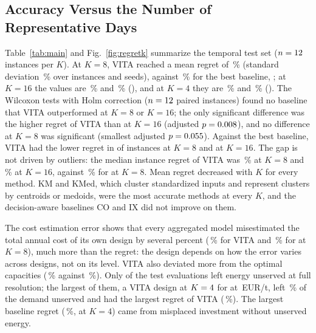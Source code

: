 \documentclass[journal]{IEEEtran}
\begin{document}
\subsection{Accuracy Versus the Number of Representative Days}
Table~\ref{tab:main} and Fig.~\ref{fig:regretk} summarize the temporal test set ($n=12$ instances per $K$). At $K=8$, VITA reached a mean regret of \RegVITAKeight\,\% (standard deviation \RegSdVITAKeight\,\% over instances and seeds), against \RegBestBaseKeight\,\% for the best baseline, \BestBaseNameKeight; at $K=16$ the values are \RegVITAKsixteen\,\% and \RegBestBaseKsixteen\,\% (\BestBaseNameKsixteen), and at $K=4$ they are \RegVITAKfour\,\% and \RegBestBaseKfour\,\% (\BestBaseNameKfour). The Wilcoxon tests with Holm correction ($n=12$ paired instances) found no baseline that VITA outperformed at $K=8$ or $K=16$; the only significant difference was the higher regret of VITA than \BestBaseNameKsixteen{} at $K=16$ (adjusted $p=0.008$), and no difference at $K=8$ was significant (smallest adjusted $p=0.055$). Against the best baseline, VITA had the lower regret in \WinsVsBestKeight{} of \NTest{} instances at $K=8$ and \WinsVsBestKsixteen{} at $K=16$. The gap is not driven by outliers: the median instance regret of VITA was \MedianRegVITAKeightInst\,\% at $K=8$ and \MedianRegVITAKsixteenInst\,\% at $K=16$, against \MedianRegBestKeight\,\% for \BestBaseNameKeight{} at $K=8$. Mean regret decreased with $K$ for every method. KM and KMed, which cluster standardized inputs and represent clusters by centroids or medoids, were the most accurate methods at every $K$, and the decision-aware baselines CO and IX did not improve on them.

The cost estimation error shows that every aggregated model misestimated the total annual cost of its own design by several percent (\CostErrVITAKeight\,\% for VITA and \CostErrBestBaseKeight\,\% for \BestBaseNameKeight{} at $K=8$), much more than the regret: the design depends on how the error varies across designs, not on its level. VITA also deviated more from the optimal capacities (\CapDevVITAKeight\,\% against \CapDevBestBaseKeight\,\%). Only \NUnservedEvals{} of the \NAllEvals{} test evaluations left energy unserved at full resolution; the largest of them, a VITA design at $K=4$ for \MaxRegVITAYear{} at \MaxRegVITAPrice\,EUR/t, left \MaxRegVITAUnserved\,\% of the demand unserved and had the largest regret of VITA (\MaxRegVITA\,\%). The largest baseline regret (\MaxRegBase\,\%, \MaxRegBaseName{} at $K=4$) came from misplaced investment without unserved energy.
\end{document}
